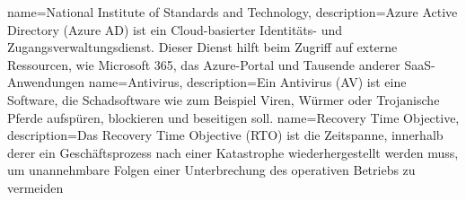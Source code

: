 {
    name=National Institute of Standards and Technology,
    description={Azure Active Directory (Azure AD) ist ein Cloud-basierter Identitäts- und Zugangsverwaltungsdienst.
            Dieser Dienst hilft beim Zugriff auf externe Ressourcen, wie Microsoft 365, das Azure-Portal und Tausende anderer SaaS-Anwendungen}
}
{
    name=Antivirus,
    description={Ein Antivirus (AV) ist eine Software, die Schadsoftware wie zum Beispiel Viren, Würmer oder Trojanische Pferde aufspüren, blockieren und beseitigen soll.}
}
{
    name=Recovery Time Objective,
    description={Das Recovery Time Objective (RTO) ist die Zeitspanne, innerhalb derer ein Geschäftsprozess nach einer Katastrophe wiederhergestellt werden muss, um unannehmbare Folgen einer Unterbrechung des operativen Betriebs zu vermeiden}
}
